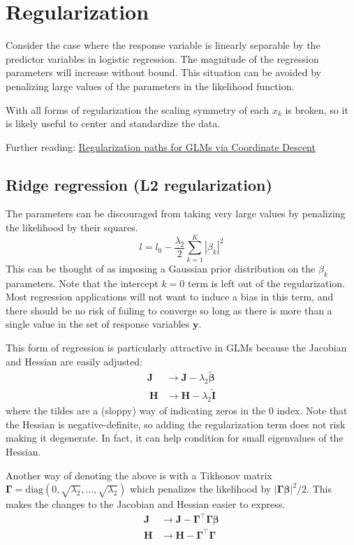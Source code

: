 \documentclass{article}
\newcommand{\bbeta}{\boldsymbol{\beta}}
\begin{document}
\section{Regularization}

Consider the case where the response variable is linearly separable by the
predictor variables in logistic regression. The magnitude of the regression
parameters will increase without bound. This situation can be avoided by
penalizing large values of the parameters in the likelihood function. 

With all forms of regularization the scaling symmetry of each \(x_k\) is
broken, so it is likely useful to center and standardize the data.

Further reading: \href{https://doi.org/10.18637/jss.v033.i01}{Regularization
paths for GLMs via Coordinate Descent}

\subsection{Ridge regression (L2 regularization)}

The parameters can be discouraged from taking very large values by penalizing
the likelihood by their squares.
\[ l = l_0 - \frac{\lambda_2}{2} \sum_{k=1}^K \left| \beta_{k} \right|^2 \]
This can be thought of as imposing a Gaussian prior distribution on the
\(\beta_k\) parameters. Note that the intercept \(k=0\) term is left out of
the regularization. Most regression applications will not want to induce a bias
in this term, and there should be no risk of failing to converge so long as
there is more than a single value in the set of response variables
\(\mathbf{y}\).

This form of regression is particularly attractive in GLMs because the Jacobian
and Hessian are easily adjusted:
\begin{align}
\mathbf{J} &\rightarrow \mathbf{J} - \lambda_2 \tilde{\bbeta} \\\
\mathbf{H} &\rightarrow \mathbf{H} - \lambda_2 \tilde{\mathbf{I}}
\end{align}
where the tildes are a (sloppy) way of indicating zeros in the \(0\) index.
Note that the Hessian is negative-definite, so adding the regularization term
does not risk making it degenerate. In fact, it can help condition for small
eigenvalues of the Hessian.

Another way of denoting the above is with a Tikhonov matrix \\
\(\boldsymbol{\Gamma} = \textrm{diag}(0, \sqrt{\lambda_2}, \ldots,
\sqrt{\lambda_2})\) which penalizes the likelihood by
\(\left|\boldsymbol{\Gamma}\bbeta\right|^2/2\). This makes the
changes to the Jacobian and Hessian easier to express.
\begin{align}
\mathbf{J} &\rightarrow \mathbf{J} - \boldsymbol{\Gamma}^\intercal\boldsymbol{\Gamma}\bbeta \\
\mathbf{H} &\rightarrow \mathbf{H} - \boldsymbol{\Gamma}^\intercal\boldsymbol{\Gamma}
\end{align}
\end{document}
